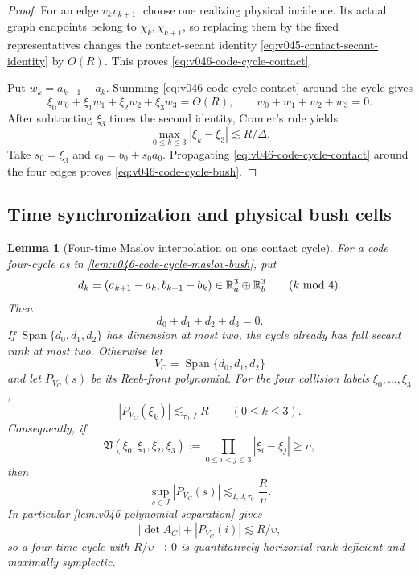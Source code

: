 \documentclass[10pt]{article}
\newtheorem{lemma}[theorem]{Lemma}
\newcommand{\R}{\mathbb R}
\newcommand{\Span}{\operatorname{Span}}
\begin{document}
\begin{proof}
For an edge \(v_kv_{k+1}\), choose one realizing physical incidence.  Its actual graph endpoints
belong to \(\chi_k,\chi_{k+1}\), so replacing them by the fixed representatives changes the
contact-secant identity \eqref{eq:v045-contact-secant-identity} by \(O(R)\).  This proves
\eqref{eq:v046-code-cycle-contact}.

Put \(w_k=a_{k+1}-a_k\).  Summing \eqref{eq:v046-code-cycle-contact} around the cycle gives
\[
\xi_0w_0+\xi_1w_1+\xi_2w_2+\xi_3w_3=O(R),
\qquad
w_0+w_1+w_2+w_3=0.
\]
After subtracting \(\xi_3\) times the second identity, Cramer's rule yields
\[
\max_{0\le k\le3}|\xi_k-\xi_3|
\lesssim R/\Delta.
\]
Take \(s_0=\xi_3\) and \(c_0=b_0+s_0a_0\).  Propagating
\eqref{eq:v046-code-cycle-contact} around the four edges proves
\eqref{eq:v046-code-cycle-bush}.
\end{proof}

\subsection{Time synchronization and physical bush cells}

\begin{lemma}[Four-time Maslov interpolation on one contact cycle]
\label{lem:v046-four-time-maslov-cycle}
For a code four-cycle as in \cref{lem:v046-code-cycle-maslov-bush}, put
\[
d_k=(a_{k+1}-a_k,b_{k+1}-b_k)\in\R_a^3\oplus\R_b^3
\qquad(k\ {\rm mod}\ 4).
\]
Then
\[
d_0+d_1+d_2+d_3=0.
\]
If \(\Span\{d_0,d_1,d_2\}\) has dimension at most two, the cycle already has full secant rank at
most two.  Otherwise let
\[
V_C=\Span\{d_0,d_1,d_2\}
\]
and let \(P_{V_C}(s)\) be its Reeb-front polynomial.  For the four collision labels
\(\xi_0,\ldots,\xi_3\),
\begin{equation}
\label{eq:v046-cycle-polynomial-values}
\boxed{
|P_{V_C}(\xi_k)|
\lesssim_{\tau_0,I}
R
\qquad(0\le k\le3).
}
\end{equation}
Consequently, if
\[
\mathfrak V(\xi_0,\xi_1,\xi_2,\xi_3)
:=
\prod_{0\le i<j\le3}|\xi_i-\xi_j|
\ge\upsilon,
\]
then
\begin{equation}
\label{eq:v046-four-time-maslov-interpolation}
\boxed{
\sup_{s\in J}|P_{V_C}(s)|
\lesssim_{I,J,\tau_0}
\frac{R}{\upsilon}.
}
\end{equation}
In particular \cref{lem:v046-polynomial-separation} gives
\[
|\det A_C|+|P_{V_C}(i)|
\lesssim
R/\upsilon,
\]
so a four-time cycle with \(R/\upsilon\to0\) is quantitatively horizontal-rank deficient and
maximally symplectic.
\end{lemma}
\end{document}
